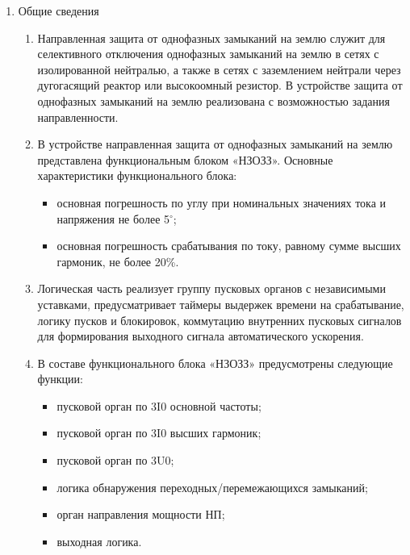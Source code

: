 
\color{black}

\begin{enumerate}

\item Общие сведения

\begin{enumerate}

\item 
Направленная защита от однофазных замыканий на землю служит для селективного отключения однофазных замыканий на землю в сетях с изолированной нейтралью, а также в сетях с заземлением нейтрали через дугогасящий реактор или высокоомный резистор. В устройстве защита от однофазных замыканий на землю реализована с возможностью задания направленности.

\item 
В устройстве направленная защита от однофазных замыканий на землю представлена функциональным блоком «НЗОЗЗ». Основные характеристики функционального блока:
\begin{itemize}
    \item основная погрешность по углу при номинальных значениях тока и напряжения не более 5$^\circ$; 
    \item основная погрешность срабатывания по току, равному сумме высших гармоник, не более 20\%.
\end{itemize}

\item
Логическая часть реализует группу пусковых органов с независимыми уставками, предусматривает таймеры выдержек времени на срабатывание, логику пусков и блокировок, коммутацию внутренних пусковых сигналов для формирования выходного сигнала автоматического ускорения.

\item
В составе функционального блока «НЗОЗЗ» предусмотрены следующие функции:
\begin{itemize}
\item пусковой орган по 3I0 основной частоты;
\item пусковой орган по 3I0 высших гармоник;
\item пусковой орган по 3U0;
\item логика обнаружения переходных/перемежающихся замыканий;
\item орган направления мощности НП;
\item выходная логика.
\end{itemize}


\end{enumerate}
\end{enumerate}
